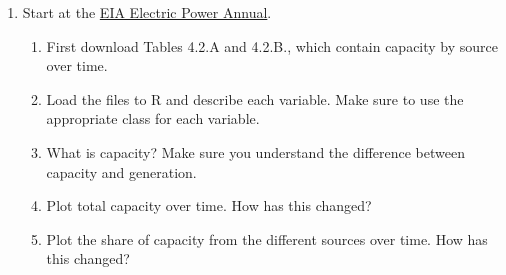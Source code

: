 \documentclass[12pt]{article}
\begin{document}
\begin{enumerate}
\item Start at the \href{https://www.eia.gov/electricity/annual/}{EIA Electric Power Annual}. 
	\begin{enumerate}
	\item First download Tables 4.2.A and 4.2.B., which contain capacity by source over time. 
	\item Load the files to R and describe each variable. Make sure to use the appropriate class for each variable.
	\item What is capacity? Make sure you understand the difference between capacity and generation.
	\item Plot total capacity over time. How has this changed?
	\item Plot the share of capacity from the different sources over time. How has this changed?
	\end{enumerate}


\end{enumerate}
\end{document}
